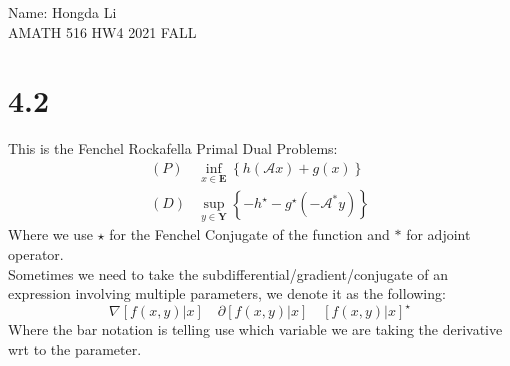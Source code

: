\documentclass[]{article}
\begin{document}
\begin{center}
    Name: Hongda Li
    \\
    AMATH 516 HW4 2021 FALL 
\end{center}
\section*{4.2}
    This is the Fenchel Rockafella Primal Dual Problems: 
    \begin{align*}\tag{4.2.1}\label{eqn:4.2.1}
        (P)& \inf_{x\in \mathbf{E}} \left\lbrace
            h(\mathcal{A}x) + g(x)
        \right\rbrace
        \\
        (D) & \sup_{y \in \mathbf{Y}} \left\lbrace
            - h^{\star} - g^\star(-\mathcal{A}^*y)
        \right\rbrace
    \end{align*}
    Where we use $\star$ for the Fenchel Conjugate of the function and $*$ for adjoint operator. 
    \\
    Sometimes we need to take the subdifferential/gradient/conjugate of an expression involving multiple parameters, we denote it as the following: 
    $$
        \nabla [f(x, y)| x] 
        \quad
        \partial [f(x, y)|x]
        \quad 
        [f(x, y)| x]^\star
    $$
    Where the bar notation is telling use which variable we are taking the derivative wrt to the parameter. 
\end{document}
